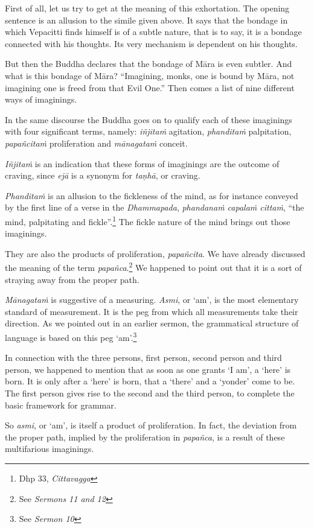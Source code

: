 First of all, let us try to get at the meaning of this exhortation. The opening sentence is an allusion to the simile given above. It says that the bondage in which Vepacitti finds himself is of a subtle nature, that is to say, it is a bondage connected with his thoughts. Its very mechanism is dependent on his thoughts.

But then the Buddha declares that the bondage of Māra is even subtler. And what is this bondage of Māra? ``Imagining, monks, one is bound by Māra, not imagining one is freed from that Evil One.'' Then comes a list of nine different ways of imaginings.

In the same discourse the Buddha goes on to qualify each of these imaginings with four significant terms, namely: \emph{iñjitaṁ} agitation, \emph{phanditaṁ} palpitation, \emph{papañcitaṁ} proliferation and \emph{mānagataṁ} conceit.

\emph{Iñjitaṁ} is an indication that these forms of imaginings are the outcome of craving, since \emph{ejā} is a synonym for \emph{taṇhā}, or craving.

\emph{Phanditaṁ} is an allusion to the fickleness of the mind, as for instance conveyed by the first line of a verse in the \emph{Dhammapada}, \emph{phandanaṁ capalaṁ cittaṁ}, ``the mind, palpitating and fickle''.\footnote{Dhp 33, \emph{Cittavagga}} The fickle nature of the mind brings out those imaginings.

They are also the products of proliferation, \emph{papañcita}. We have already discussed the meaning of the term \emph{papañca}.\footnote{See \emph{Sermons 11 and 12}} We happened to point out that it is a sort of straying away from the proper path.

\emph{Mānagataṁ} is suggestive of a measuring. \emph{Asmi}, or `am', is the most elementary standard of measurement. It is the peg from which all measurements take their direction. As we pointed out in an earlier sermon, the grammatical structure of language is based on this peg `am'.\footnote{See \emph{Sermon 10}}

In connection with the three persons, first person, second person and third person, we happened to mention that as soon as one grants `I am', a `here' is born. It is only after a `here' is born, that a `there' and a `yonder' come to be. The first person gives rise to the second and the third person, to complete the basic framework for grammar.

So \emph{asmi}, or `am', is itself a product of proliferation. In fact, the deviation from the proper path, implied by the proliferation in \emph{papañca}, is a result of these multifarious imaginings.

